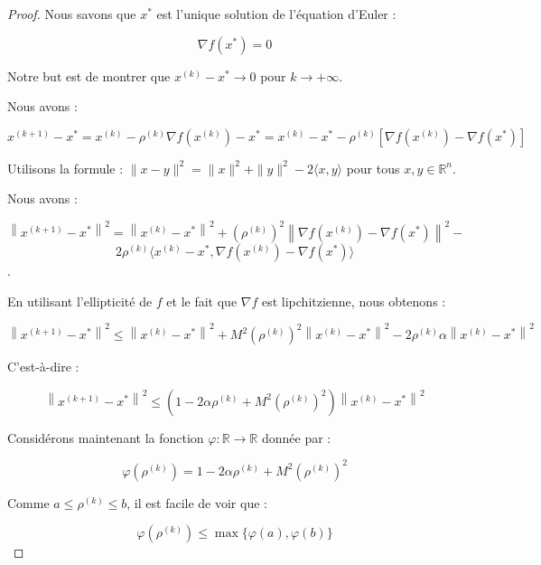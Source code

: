 \documentclass[12pt,a4paper,openay]{book}
\numberwithin{equation}{chapter}
\newcommand{\R}{\mathbb{R}}
\newcommand{\rok}{\rho^{(k)}}
\begin{document}
	\begin{proof}
		
		Nous savons que $x^{*}$ est l'unique solution de l'\'equation d'Euler :
		
		$$
		\nabla f\left(x^{*}\right)=0
		$$
		
		Notre but est de montrer que $x^{(k)}-x^{*} \to 0$ pour $k \to+\infty$.
		
		Nous avons :
		
		$$
		x^{(k+1)}-x^{*}=x^{(k)}-\rho^{(k)} \nabla f\left(x^{(k)}\right)-x^{*}=x^{(k)}-x^{*}-\rho^{(k)}\left[\nabla f\left(x^{(k)}\right)-\nabla f\left(x^{*}\right)\right]
		$$
		
		Utilisons la formule : $\|x-y\|^{2}=\|x\|^{2}+\|y\|^{2}-2\langle x, y\rangle$ pour tous $x, y \in \R^{n}$.
		
		Nous avons :
		
		$$\left\|x^{(k+1)}-x^{*}\right\|^{2}=\left\|x^{(k)}-x^{*}\right\|^{2}+\left(\rho^{(k)}\right)^{2}\left\|\nabla f\left(x^{(k)}\right)-\nabla f\left(x^{*}\right)\right\|^{2}-$$
		 $$2 \rho^{(k)} \langle x^{(k)}- x^{*}, \nabla f\left(x^{(k)}\right)-\nabla f\left(x^{*}\right)\rangle$$.
					
		En utilisant l'ellipticit\'e de $f$ et le fait que $\nabla f$ est lipchitzienne, nous obtenons :
		
		$$
		\left\|x^{(k+1)}-x^{*}\right\|^{2} \leq\left\|x^{(k)}-x^{*}\right\|^{2}+M^{2}\left(\rho^{(k)}\right)^{2}\left\|x^{(k)}-x^{*}\right\|^{2}-2 \rho^{(k)} \alpha\left\|x^{(k)}-x^{*}\right\|^{2}
		$$
		
		C'est-\`a-dire :
		
		
		\begin{equation}
		\left\|x^{(k+1)}-x^{*}\right\|^{2} \leq\left(1-2 \alpha \rho^{(k)}+M^{2}\left(\rho^{(k)}\right)^{2}\right)\left\|x^{(k)}-x^{*}\right\|^{2} \label{1}
		\end{equation}
		
		
		Consid\'erons maintenant la fonction $\varphi: \R \to \R$ donn\'ee par :
		
		$$
		\varphi\left(\rok\right)=1-2 \alpha \rho^{(k)}+M^{2} \left(\rok\right)^{2}
		$$
		
		Comme $a \leq \rho^{(k)} \leq b$, il est facile de voir que :
		
		
		\begin{equation}
		\varphi\left(\rho^{(k)}\right) \leq \max \{\varphi(a), \varphi(b)\} \label{2}
		\end{equation}
		

\end{proof}
\end{document}
